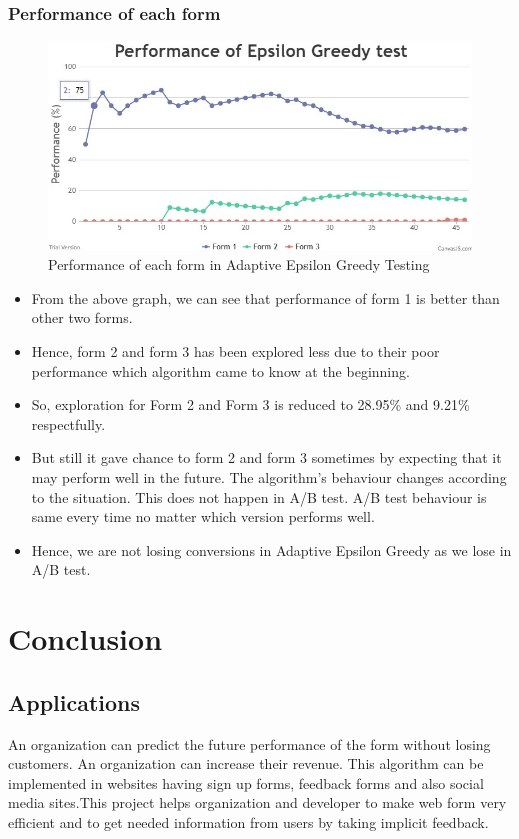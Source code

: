 \documentclass[12pt]{report}
\begin{document}
\subsection{Performance of each form}
\begin{figure}[H]
\caption{Performance of each form in Adaptive Epsilon Greedy Testing}
\includegraphics[scale=0.8]{performanceepsilon.jpg}
\end{figure}
\begin{itemize}
\item From the above graph, we can see that performance of form 1 is better than other two forms.
\item Hence, form 2 and form 3 has been explored less due to their poor performance which algorithm came to know at the beginning.
\item So, exploration for Form 2 and Form 3 is reduced to 28.95\% and 9.21\% respectfully.
\item But still it gave chance to form 2 and form 3 sometimes by expecting that it may perform well in the future. The algorithm’s behaviour changes according to the situation. This does not happen in A/B test. A/B test behaviour is same every time no matter which version performs well.
\item Hence, we are not losing conversions in Adaptive Epsilon Greedy as we lose in A/B test.
\end{itemize}
\chapter {Conclusion}
\section{Applications}
 An organization can predict the future performance of the form without losing customers. ‌An organization can increase their revenue. This algorithm can be implemented in websites having sign up forms, feedback forms and also social media sites.This project helps organization and developer to make web form very efficient and to get needed information from users by taking implicit feedback.
\end{document}
